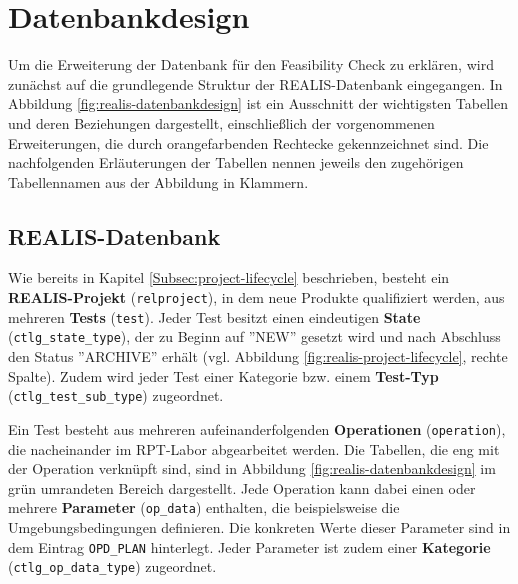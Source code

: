 \section{Datenbankdesign}
Um die Erweiterung der Datenbank für den Feasibility Check zu erklären, wird zunächst auf die grundlegende Struktur der REALIS-Datenbank eingegangen. In Abbildung \ref{fig:realis-datenbankdesign} ist ein Ausschnitt der wichtigsten Tabellen und deren Beziehungen dargestellt, einschließlich der vorgenommenen Erweiterungen, die durch orangefarbenden Rechtecke gekennzeichnet sind. Die nachfolgenden Erläuterungen der Tabellen nennen jeweils den zugehörigen Tabellennamen aus der Abbildung in Klammern.

\subsection{REALIS-Datenbank}

Wie bereits in Kapitel \ref{Subsec:project-lifecycle} beschrieben, besteht ein \textbf{REALIS-Projekt} (\texttt{relproject}), in dem neue Produkte qualifiziert werden, aus mehreren \textbf{Tests} (\texttt{test}). Jeder Test besitzt einen eindeutigen \textbf{State} (\texttt{ctlg\_state\_type}), der zu Beginn auf ''NEW'' gesetzt wird und nach Abschluss den Status ''ARCHIVE'' erhält (vgl. Abbildung \ref{fig:realis-project-lifecycle}, rechte Spalte). Zudem wird jeder Test einer Kategorie bzw. einem \textbf{Test-Typ} (\texttt{ctlg\_test\-\_sub\_type}) zugeordnet.

Ein Test besteht aus mehreren aufeinanderfolgenden \textbf{Operationen} (\texttt{operation}), die nacheinander im \gls{RPT}-Labor abgearbeitet werden. Die Tabellen, die eng mit der Operation verknüpft sind, sind in Abbildung \ref{fig:realis-datenbankdesign} im grün umrandeten Bereich dargestellt. Jede Operation kann dabei einen oder mehrere \textbf{Parameter} (\texttt{op\_data}) enthalten, die beispielsweise die Umgebungsbedingungen definieren. Die konkreten Werte dieser Parameter sind in dem Eintrag \texttt{OPD\_PLAN} hinterlegt. Jeder Parameter ist zudem einer \textbf{Kategorie} (\texttt{ctlg\_op\_\-data\_type}) zugeordnet.  


